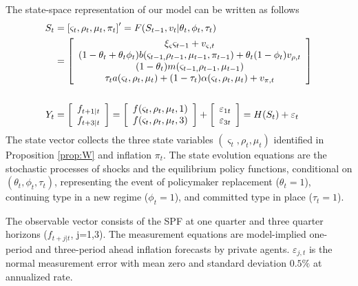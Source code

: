 \documentclass[12pt,letter,leqno]{article}
\theoremstyle{asn}
\theoremstyle{lem}
\theoremstyle{slem}
\theoremstyle{prop}
\theoremstyle{appprop}
\theoremstyle{rem}
\theoremstyle{defn}
\begin{document}
The state-space representation of our model can be written as follows
\begin{align}
S_{t}  & =\left[ \varsigma_{t}, \rho_{t}, \mu_{t}, \pi_{t} \right]' =F(S_{t-1},v_{t}|\theta_t,\phi_t,\tau_t) \label{appS}\\
& =\left[
\begin{array}
[c]{c}%
\xi_\varsigma\varsigma_{t-1}+v_{\varsigma,t}\\
(1-\theta_{t}+\theta_{t}\phi_{t})b(\varsigma_{t-1,}\rho_{t-1},\mu_{t-1},\pi_{t-1}
)+\theta_{t}(1-\phi_{t})v_{\rho,t}\\
(1-\theta_{t})m(\varsigma_{t-1,}\rho_{t-1},\mu_{t-1})\\
\tau_{t}a(\varsigma_{t},\rho_{t},\mu_{t})+(1-\tau_{t})\alpha(\varsigma
_{t},\rho_{t},\mu_{t})+v_{\pi,t}%
\end{array}
\right] \nonumber\\
\nonumber\\
Y_{t}&=\left[
\begin{array}
[c]{c}%
f_{t+1|t}\\
f_{t+3|t}\\
\end{array}
\right]  =\left[
\begin{array}
[c]{c}%
f(\varsigma_{t},\rho_{t},\mu_{t},1)\\
f(\varsigma_{t},\rho_{t},\mu_{t},3)\\
\end{array}
\right]  +\left[
\begin{array}
[c]{c}%
\varepsilon_{1t}\\
\varepsilon_{3t}\\
\end{array}
\right] =H(S_{t}) + \varepsilon_{t} \label{appY}
\end{align}
The state vector collects the three state variables 
$(\varsigma _{t},\rho _{t},\mu _{t})$ identified in Proposition \ref{prop:W} and inflation $\pi_t$. The state evolution equations are the stochastic processes of shocks and the equilibrium policy functions, conditional on $(\theta_t,\phi_t,\tau_t)$, representing the event of policymaker replacement ($\theta_t=1$), continuing type in a new regime ($\phi_t=1$), and committed type in place ($\tau_t=1$). 

The observable vector consists of the SPF at one quarter and three quarter horizons ($f_{t+j|t}$, j=1,3). The measurement equations are model-implied one-period and three-period ahead inflation forecasts by private agents. $\varepsilon_{j,t}$ is the normal measurement error with mean zero and standard deviation $0.5\%$ at annualized rate. 
\end{document}
